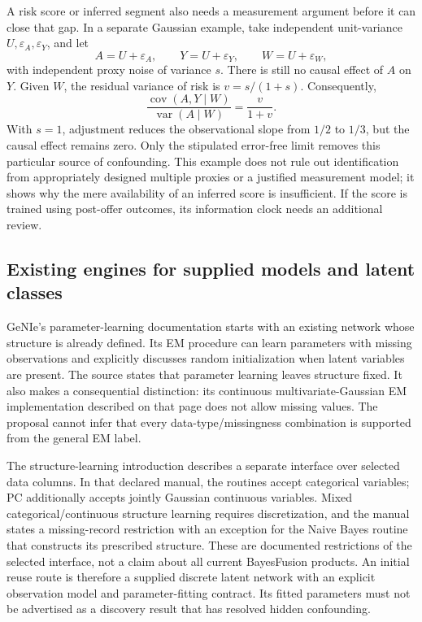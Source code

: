A risk score or inferred segment also needs a measurement argument
before it can close that gap. In a separate Gaussian example, take
independent unit-variance \(U,\varepsilon_A,\varepsilon_Y\), and let \[
 A=U+\varepsilon_A,\qquad Y=U+\varepsilon_Y,\qquad
 W=U+\varepsilon_W,
\] with independent proxy noise of variance \(s\). There is still no
causal effect of \(A\) on \(Y\). Given \(W\), the residual variance of
risk is \(v=s/(1+s)\). Consequently, \[
 \frac{\operatorname{cov}(A,Y\mid W)}
      {\operatorname{var}(A\mid W)}=
 \frac{v}{1+v}.
\] With \(s=1\), adjustment reduces the observational slope from \(1/2\)
to \(1/3\), but the causal effect remains zero. Only the stipulated
error-free limit removes this particular source of confounding. This
example does not rule out identification from appropriately designed
multiple proxies or a justified measurement model; it shows why the mere
availability of an inferred score is insufficient. If the score is
trained using post-offer outcomes, its information clock needs an
additional review. \citep{exec13_latent_examples}

\hypertarget{existing-engines-for-supplied-models-and-latent-classes}{%
\subsection{Existing engines for supplied models and latent
classes}\label{existing-engines-for-supplied-models-and-latent-classes}}

GeNIe's parameter-learning documentation starts with an existing network
whose structure is already defined. Its EM procedure can learn
parameters with missing observations and explicitly discusses random
initialization when latent variables are present. The source states that
parameter learning leaves structure fixed. It also makes a consequential
distinction: its continuous multivariate-Gaussian EM implementation
described on that page does not allow missing values. The proposal
cannot infer that every data-type/missingness combination is supported
from the general EM label. \citep{exec13_latent_genie_parameters}

The structure-learning introduction describes a separate interface over
selected data columns. In that declared manual, the routines accept
categorical variables; PC additionally accepts jointly Gaussian
continuous variables. Mixed categorical/continuous structure learning
requires discretization, and the manual states a missing-record
restriction with an exception for the Naive Bayes routine that
constructs its prescribed structure. These are documented restrictions
of the selected interface, not a claim about all current BayesFusion
products. An initial reuse route is therefore a supplied discrete latent
network with an explicit observation model and parameter-fitting
contract. Its fitted parameters must not be advertised as a discovery
result that has resolved hidden confounding.
\citep{exec13_latent_genie_structure,exec13_latent_genie_parameters}

